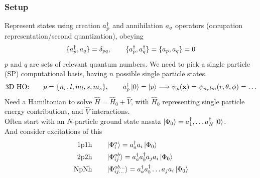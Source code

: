 \documentclass[
11pt,notheorems,hyperref={pdfauthor=whatever}
]{beamer}
\begin{document}
\begin{frame}
    \frametitle{Setup}
    Represent states using creation $a_{p}^{\dagger}$ and annihilation $a_{q}$ operators (occupation representation/second quantization), obeying
    \begin{align*}
        \mathset{\crt{p},\ani{q}} = \delta_{pq},\hspace{20px}\mathset{\crt{p},\crt{q}} = \mathset{\ani{p},\ani{q}} = 0
    \end{align*}
    $p$ and $q$ are sets of relevant quantum numbers. We need to pick a single particle (SP) computational basis, having $n$ possible single particle states.
    \begin{align*}
        \text{3D HO:}\hspace{20px}p = \mathset{n_r,l,m_l,s,m_s},\hspace{20px} \crt{p} \vac = \ket{p} \longrightarrow \psi_p(\bold{x}) = \psi_{n_r l m}(r, \theta, \phi) = \ldots 
    \end{align*} 
    Need a Hamiltonian to solve $\hat{H} = \hat{H}_0 + \hat{V}$, with $\hat{H}_0$ representing single particle energy contributions, and $\hat{V}$ interactions.
    \\[10pt]
    Often start with an $N$-particle ground state ansatz $\ket{\Phi_0} = a_{1}^{\dagger},\ldots a_{N}^{\dagger} \ket{0}$.
    \\[10pt]
    And consider excitations of this
    \begin{align*}
        \text{1p1h}\hspace{20px}&\exed{i}{a} = \crt{a}\ani{i}\gs \\
        \text{2p2h}\hspace{20px}&\exed{ij}{ab} = \crt{a}\crt{b}\ani{j}\ani{i}\gs  \\
        \text{NpNh}\hspace{20px}&\exed{ij\ldots}{ab\ldots} = \crt{a}\crt{b}\ldots\ani{j}\ani{i}\gs 
    \end{align*}
\end{frame}
\end{document}

